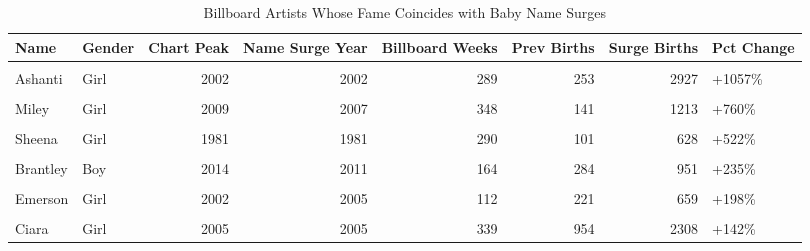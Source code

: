 \documentclass[
]{article}
\begin{document}
\begin{longtable}[t]{llrrrrrl}
\caption{\label{tab:billboard-match}Billboard Artists Whose Fame Coincides with Baby Name Surges}\\
\toprule
Name & Gender & Chart Peak & Name Surge Year & Billboard Weeks & Prev Births & Surge Births & Pct Change\\
\midrule
\cellcolor{gray!10}{Tennille} & \cellcolor{gray!10}{Girl} & \cellcolor{gray!10}{1976} & \cellcolor{gray!10}{1976} & \cellcolor{gray!10}{198} & \cellcolor{gray!10}{53} & \cellcolor{gray!10}{736} & \cellcolor{gray!10}{+1289\%}\\
Ashanti & Girl & 2002 & 2002 & 289 & 253 & 2927 & +1057\%\\
\cellcolor{gray!10}{Mya} & \cellcolor{gray!10}{Girl} & \cellcolor{gray!10}{2000} & \cellcolor{gray!10}{1998} & \cellcolor{gray!10}{181} & \cellcolor{gray!10}{136} & \cellcolor{gray!10}{1251} & \cellcolor{gray!10}{+820\%}\\
Miley & Girl & 2009 & 2007 & 348 & 141 & 1213 & +760\%\\
\cellcolor{gray!10}{Shanice} & \cellcolor{gray!10}{Girl} & \cellcolor{gray!10}{1992} & \cellcolor{gray!10}{1992} & \cellcolor{gray!10}{106} & \cellcolor{gray!10}{259} & \cellcolor{gray!10}{1837} & \cellcolor{gray!10}{+609\%}\\
\addlinespace
Sheena & Girl & 1981 & 1981 & 290 & 101 & 628 & +522\%\\
\cellcolor{gray!10}{Sade} & \cellcolor{gray!10}{Girl} & \cellcolor{gray!10}{1985} & \cellcolor{gray!10}{1986} & \cellcolor{gray!10}{140} & \cellcolor{gray!10}{355} & \cellcolor{gray!10}{1214} & \cellcolor{gray!10}{+242\%}\\
Brantley & Boy & 2014 & 2011 & 164 & 284 & 951 & +235\%\\
\cellcolor{gray!10}{Shania} & \cellcolor{gray!10}{Girl} & \cellcolor{gray!10}{1999} & \cellcolor{gray!10}{1996} & \cellcolor{gray!10}{298} & \cellcolor{gray!10}{546} & \cellcolor{gray!10}{1827} & \cellcolor{gray!10}{+235\%}\\
Emerson & Girl & 2002 & 2005 & 112 & 221 & 659 & +198\%\\
\addlinespace
\cellcolor{gray!10}{Beyonce} & \cellcolor{gray!10}{Girl} & \cellcolor{gray!10}{2009} & \cellcolor{gray!10}{2007} & \cellcolor{gray!10}{884} & \cellcolor{gray!10}{56} & \cellcolor{gray!10}{145} & \cellcolor{gray!10}{+159\%}\\
Ciara & Girl & 2005 & 2005 & 339 & 954 & 2308 & +142\%\\
\bottomrule
\end{longtable}
\end{document}
